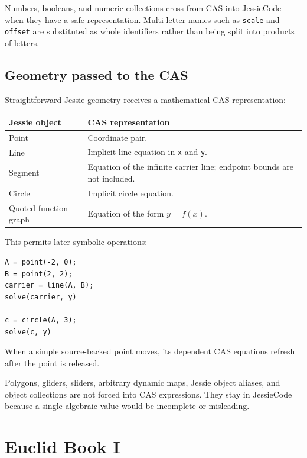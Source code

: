 \documentclass[11pt,a4paper]{article}
\newcommand{\code}[1]{\texttt{#1}}
\begin{document}
Numbers, booleans, and numeric collections cross from CAS into JessieCode when they have a safe representation. Multi-letter names such as \code{scale} and \code{offset} are substituted as whole identifiers rather than being split into products of letters.

\subsection{Geometry passed to the CAS}

Straightforward Jessie geometry receives a mathematical CAS representation:

\begin{tabularx}{\textwidth}{@{}l X@{}}
\toprule
\textbf{Jessie object} & \textbf{CAS representation} \\
\midrule
Point & Coordinate pair. \\
Line & Implicit line equation in \code{x} and \code{y}. \\
Segment & Equation of the infinite carrier line; endpoint bounds are not included. \\
Circle & Implicit circle equation. \\
Quoted function graph & Equation of the form \(y=f(x)\). \\
\bottomrule
\end{tabularx}

This permits later symbolic operations:

\begin{lstlisting}[style=jessie]
A = point(-2, 0);
B = point(2, 2);
carrier = line(A, B);
solve(carrier, y)

c = circle(A, 3);
solve(c, y)
\end{lstlisting}

When a simple source-backed point moves, its dependent CAS equations refresh after the point is released.

\begin{notebox}
Polygons, gliders, sliders, arbitrary dynamic maps, Jessie object aliases, and object collections are not forced into CAS expressions. They stay in JessieCode because a single algebraic value would be incomplete or misleading.
\end{notebox}

\section{Euclid Book I}
\end{document}
